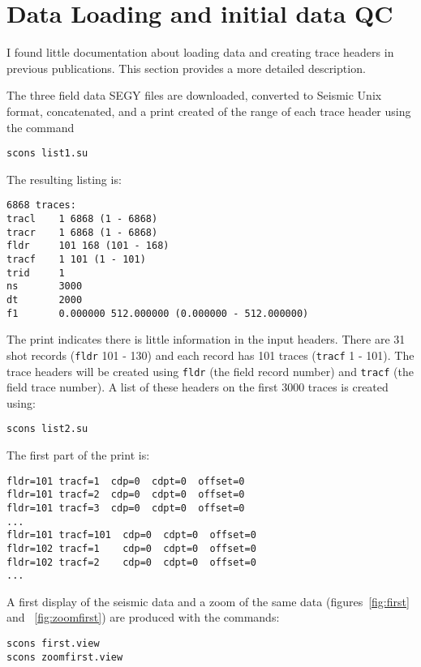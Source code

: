\section{Data Loading and initial data QC}

I found little documentation about loading data and creating trace
headers in previous publications.  This section provides a more
detailed description.

The three field data SEGY files are downloaded, converted to Seismic 
Unix format, concatenated, and a print created of the range of each trace 
header using the command
\begin{verbatim}
scons list1.su
\end{verbatim}

The resulting listing is:
\begin{verbatim}
6868 traces:
tracl    1 6868 (1 - 6868)
tracr    1 6868 (1 - 6868)
fldr     101 168 (101 - 168)
tracf    1 101 (1 - 101)
trid     1
ns       3000
dt       2000
f1       0.000000 512.000000 (0.000000 - 512.000000)
\end{verbatim}

The print indicates there is little information in the input headers.
There are 31 shot records (\texttt{fldr} 101 - 130) and each record has 101
traces (\texttt{tracf} 1 - 101).  The trace headers will be created using \texttt{fldr}
(the field record number) and \texttt{tracf} (the field trace number).  A list 
of these headers on the first 3000 traces is created using:
\begin{verbatim}
scons list2.su 
\end{verbatim}

The first part of the print is: 
\begin{verbatim}
fldr=101 tracf=1  cdp=0	 cdpt=0  offset=0 
fldr=101 tracf=2  cdp=0	 cdpt=0  offset=0 	
fldr=101 tracf=3  cdp=0  cdpt=0  offset=0 
... 
fldr=101 tracf=101  cdp=0  cdpt=0  offset=0 
fldr=102 tracf=1    cdp=0  cdpt=0  offset=0 
fldr=102 tracf=2    cdp=0  cdpt=0  offset=0 
...
\end{verbatim}

A first display of the seismic data and a zoom of the same data 
(figures~\ref{fig:first} and ~\ref{fig:zoomfirst}) are
produced with the commands: 
\begin{verbatim}
scons first.view 
scons zoomfirst.view
\end{verbatim}



